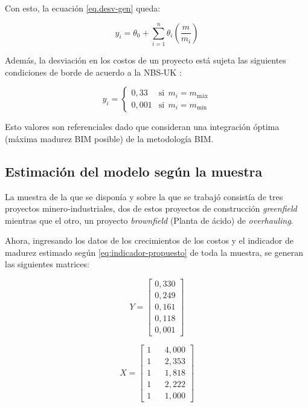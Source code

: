 Con esto, la ecuación \eqref{eq.desv-gen} queda:

\begin{equation}
    y_i = \theta_0 + \sum\limits_{i=1}^n \theta_i \left(\frac{m}{m_i} \right)
\end{equation}

Además, la desviación en los costos de un proyecto está sujeta las siguientes condiciones de borde de acuerdo a la NBS-UK \cite{nbs}:

\begin{equation}
    y_i = 
    \begin{cases}
        0,33 & \text{si}~~ m_i = m_{\text{máx}} \\
        0,001 & \text{si}~~ m_i = m_{\text{mín}}
    \end{cases}
\end{equation}

Esto valores son referenciales dado que consideran una integración óptima (máxima madurez BIM posible) de la metodología BIM.


\subsection{Estimación del modelo según la muestra}

La muestra de la que se disponía y sobre la que se trabajó consistía de tres proyectos minero-industriales, dos de estos proyectos de construcción \emph{greenfield} mientras que el otro, un proyecto \emph{brownfield} (Planta de ácido) de \emph{overhauling}.

Ahora, ingresando los datos de los crecimientos de los costos y el indicador de madurez estimado según \eqref{eq:indicador-propuesto} de toda la muestra, se generan las siguientes matrices:

\begin{minipage}{.45\linewidth}
    \begin{equation*}
    Y = 
        \begin{bmatrix}
            0,330 \\
            0,249 \\
            0,161 \\
            0,118 \\
            0,001 
        \end{bmatrix}
    \end{equation*}
\end{minipage}
\begin{minipage}{.45\linewidth}
    \begin{equation*}
    X = 
        \begin{bmatrix}
            1 & & 4,000 \\
            1 & & 2,353 \\
            1 & & 1,818 \\
            1 & & 2,222 \\
            1 & & 1,000
        \end{bmatrix}
    \end{equation*}
\end{minipage}

